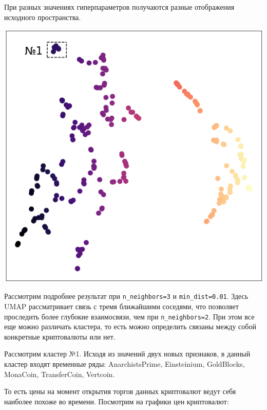 \graphicspath{{main/}}
При разных значениях гиперпараметров получаются разные отображения исходного пространства.

\begin{multicols}{2}
	\includegraphics[width=0.85\linewidth]{show.png}\columnbreak
	
	Рассмотрим подробнее результат при \verb|n_neighbors=3| и \verb|min_dist=0.01|. Здесь UMAP рассматривает связь с тремя ближайшими соседями, что позволяет проследить более глубокие взаимосвязи, чем при \verb|n_neighbors=2|. При этом все еще можно различать кластера, то есть можно определить связаны между собой конкретные криптовалюты или нет.
	
	Рассмотрим кластер №1. Исходя из значений двух новых признаков, в данный кластер входят временные ряды: AnarchistsPrime, Einsteinium, GoldBlocks, MonaCoin, TransferCoin, Vertcoin.
\end{multicols}

То есть цены на момент открытия торгов данных криптовалют ведут себя наиболее похоже во времени. Посмотрим на графики цен криптовалют:

\begin{figure}[H]
	\noindent {}
\end{figure}

